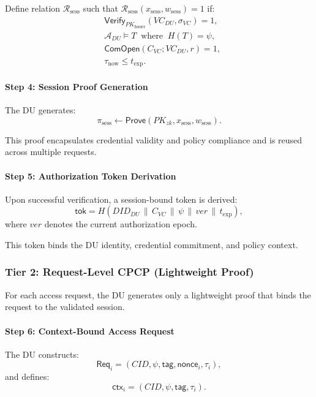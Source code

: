 \documentclass[conference]{IEEEtran}
\begin{document}
Define relation $\mathcal{R}_{\mathrm{sess}}$ such that $\mathcal{R}_{\mathrm{sess}}(x_{\mathrm{sess}}, w_{\mathrm{sess}})=1$ if:
\begin{align}
&\textsf{Verify}_{PK_{\mathrm{Issuer}}}(VC_{DU}, \sigma_{VC}) = 1, \\
&\mathcal{A}_{DU} \models T \;\;\text{where}\;\; H(T)=\psi, \\
&\textsf{ComOpen}(C_{VC}; VC_{DU}, r)=1, \\
&\tau_{\mathrm{now}} \leq t_{\mathrm{exp}}.
\end{align}

\paragraph*{\textbf{Step 4: Session Proof Generation}}

The DU generates:
\[
\pi_{\mathrm{sess}} \leftarrow \textsf{Prove}(PK_{zk}, x_{\mathrm{sess}}, w_{\mathrm{sess}}).
\]

This proof encapsulates credential validity and policy compliance and is reused across multiple requests.

\paragraph*{\textbf{Step 5: Authorization Token Derivation}}

Upon successful verification, a session-bound token is derived:
\[
\mathsf{tok} = H(DID_{DU} \,\|\, C_{VC} \,\|\, \psi \,\|\, ver \,\|\, t_{\mathrm{exp}}),
\]
where $ver$ denotes the current authorization epoch.

This token binds the DU identity, credential commitment, and policy context.

\medskip

\subsubsection*{Tier 2: Request-Level CPCP (Lightweight Proof)}

For each access request, the DU generates only a lightweight proof that binds the request to the validated session.

\paragraph*{\textbf{Step 6: Context-Bound Access Request}}

The DU constructs:
\[
\mathsf{Req}_i = (CID, \psi, \mathsf{tag}, \mathsf{nonce}_i, \tau_i),
\]
and defines:
\[
\mathsf{ctx}_i = (CID, \psi, \mathsf{tag}, \tau_i).
\]
\end{document}
